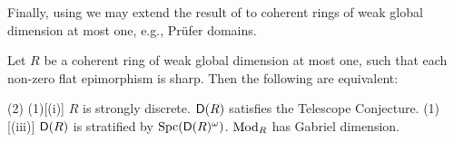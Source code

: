 \documentclass[reqno,a4paper]{amsart}
\begin{document}
Finally, using  we may extend the result of  to coherent rings of weak global dimension at most one, e.g., Prüfer domains.
\begin{corollary}\label{cor:kgandwgld}
    Let $R$ be a coherent ring of weak global dimension at most one, such that each non-zero flat epimorphism is sharp. Then the following are equivalent:
\begin{tasks}[style=enumerate, label-align=right ,column-sep = {-7mm},item-indent = {7mm},label-offset = {0.8em} ](2)
        \task*(1)[(i)] $R$ is strongly discrete.
        \task*[(ii)] $\mathsf{D}(R)$ satisfies the Telescope Conjecture.
        \task*(1)[(iii)] $\mathsf{D}(R)$ is stratified by $\operatorname{Spc}(\mathsf{D}(R)^\omega)$.
        \task*[(iv)] $\operatorname{Mod}_R$ has Gabriel dimension.
    \end{tasks}
\end{corollary}
\end{document}
